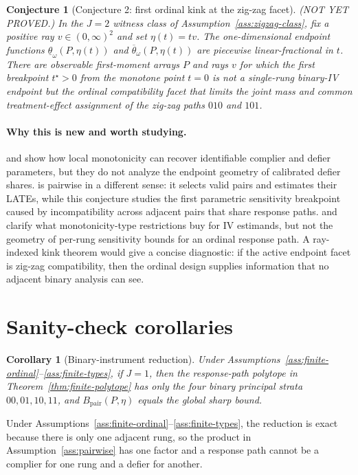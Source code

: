\documentclass[11pt]{article}
\theoremstyle{definition}
\theoremstyle{plain}
\newtheorem{conjecture}{Conjecture}
\newtheorem{corollary}{Corollary}
\theoremstyle{remark}
\begin{document}
\begin{conjecture}[Conjecture 2: first ordinal kink at the zig-zag facet]\label{conj:kink}
(NOT YET PROVED.)  In the \(J=2\) witness class of Assumption~\ref{ass:zigzag-class}, fix a positive ray \(v\in(0,\infty)^2\) and set \(\eta(t)=t v\).  The one-dimensional endpoint functions \(\underline\theta_\omega(P,\eta(t))\) and \(\overline\theta_\omega(P,\eta(t))\) are piecewise linear-fractional in \(t\).  There are observable first-moment arrays \(P\) and rays \(v\) for which the first breakpoint \(t^\star>0\) from the monotone point \(t=0\) is not a single-rung binary-IV endpoint but the ordinal compatibility facet that limits the joint mass and common treatment-effect assignment of the zig-zag paths \(010\) and \(101\).
\end{conjecture}
\paragraph{Why this is new and worth studying.}
\citet{HuberMellace2012} and \citet{DahlHuberMellace2023} show how local monotonicity can recover identifiable complier and defier parameters, but they do not analyze the endpoint geometry of calibrated defier shares.  \citet{SunWuthrich2025} is pairwise in a different sense: it selects valid pairs and estimates their LATEs, while this conjecture studies the first parametric sensitivity breakpoint caused by incompatibility across adjacent pairs that share response paths.  \citet{MogstadTorgovitskyWalters2021} and \citet{BaiHuangMoonShaikhVytlacil2024} clarify what monotonicity-type restrictions buy for IV estimands, but not the geometry of per-rung sensitivity bounds for an ordinal response path.  A ray-indexed kink theorem would give a concise diagnostic: if the active endpoint facet is zig-zag compatibility, then the ordinal design supplies information that no adjacent binary analysis can see.

\section{Sanity-check corollaries}
\begin{corollary}[Binary-instrument reduction]\label{cor:binary}
Under Assumptions~\ref{ass:finite-ordinal}--\ref{ass:finite-types}, if \(J=1\), then the response-path polytope in Theorem~\ref{thm:finite-polytope} has only the four binary principal strata \(00,01,10,11\), and \(B_{\mathrm{pair}}(P,\eta)\) equals the global sharp bound.
\end{corollary}
Under Assumptions~\ref{ass:finite-ordinal}--\ref{ass:finite-types}, the reduction is exact because there is only one adjacent rung, so the product in Assumption~\ref{ass:pairwise} has one factor and a response path cannot be a complier for one rung and a defier for another.
\end{document}
